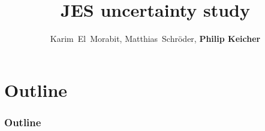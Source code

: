 \documentclass[18pt]{beamer}
\title[JES uncertainty study]{JES uncertainty study}
\author[Philip Keicher]{Karim~El~Morabit, Matthias~Schröder, \textbf{Philip Keicher}}
\institute{Institut für Experimentelle Kernphysik (IEKP)}
\begin{document}


\begin{frame}
\titlepage
\end{frame}

\section*{Outline}
\begin{frame}[label={outline}]
	\frametitle{Outline}
	\tableofcontents
\end{frame}



%





\beginbackup

%


\backupend
\end{document}
